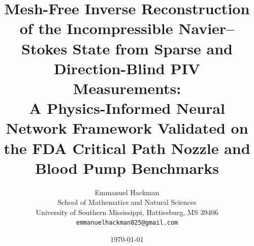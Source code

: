 \documentclass[12pt,a4paper]{article}
\begin{document}
\linenumbers

\title{
  \textbf{Mesh-Free Inverse Reconstruction of the Incompressible
  Navier--Stokes State from Sparse and Direction-Blind PIV
  Measurements:\\
  A Physics-Informed Neural Network Framework Validated on the
  FDA Critical Path Nozzle and Blood Pump Benchmarks}
}

\author{
  Emmanuel Hackman\\
  \small School of Mathematics and Natural Sciences\\
  \small University of Southern Mississippi, Hattiesburg, MS 39406\\
  \small \texttt{emmanuelhackman825@gmail.com}
}

\date{\today}
\maketitle
\end{document}
